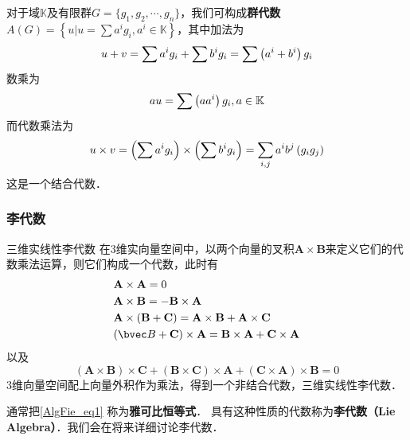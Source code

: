 \begin{example}{}
对于域$\mathbb{K} $及有限群$G=\{g_1,g_2,\cdots,g_n\}$，我们可构成\textbf{群代数}$\displaystyle A(G)=\left\{u | u=\sum a^{i} g_{i}, a^{i} \in \mathbb{K}\right\}$，其中加法为
\begin{equation}
u+v=\sum a^{i} g_{i}+\sum b^{i} g_{i}=\sum\left(a^{i}+b^{i}\right) g_{i} \notag
\end{equation}
数乘为
\begin{equation}
a u=\sum\left(a a^{i}\right) g_{i}, a \in \mathbb{K} \notag
\end{equation}
而代数乘法为
\begin{equation}
u \times v=\left(\sum a^{i} g_{i}\right) \times\left(\sum b^{i} g_{i}\right)=\sum_{i, j} a^{i} b^{j}\left(g_{i} g_{j}\right) \notag
\end{equation}
这是一个结合代数．
\end{example}

\subsubsection{李代数}

\begin{example}{三维实线性李代数}
在$3$维实向量空间中，以两个向量的叉积$\mathbf A\times \mathbf B$来定义它们的代数乘法运算，则它们构成一个代数，此时有
\begin{equation}
\begin{aligned}
&\mathbf{A} \times \mathbf{A}=0\\
&\mathbf{A} \times \mathbf{B}=-\mathbf{B} \times \mathbf{A}\\
&\mathbf{A} \times(\mathbf{B}+\mathbf{C})=\mathbf{A} \times \mathbf{B}+\mathbf{A} \times \mathbf{C}\\
&(\bvec B+\mathbf{C}) \times \mathbf{A}=\mathbf{B} \times \mathbf{A}+\mathbf{C} \times \mathbf{A}
\end{aligned}
\end{equation}
以及
\begin{equation} \label{AlgFie_eq1}
(\mathbf{A} \times \mathbf{B}) \times \mathbf{C}+(\mathbf{B} \times \mathbf{C}) \times \mathbf{A}+(\mathbf{C} \times \mathbf{A}) \times \mathbf{B}=0
\end{equation}
$3$维向量空间配上向量外积作为乘法，得到一个非结合代数，三维实线性李代数．
\end{example}

通常把\autoref{AlgFie_eq1} 称为\textbf{雅可比恒等式}． 具有这种性质的代数称为\textbf{李代数（Lie Algebra）}．我们会在将来详细讨论李代数．


